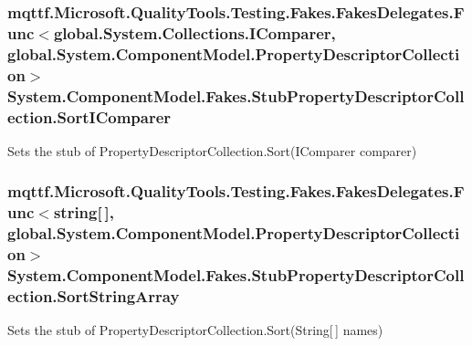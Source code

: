 \hypertarget{class_system_1_1_component_model_1_1_fakes_1_1_stub_property_descriptor_collection_a842e0e66770d608d265cc1eefef45831}{
\subsubsection[{Sort\-I\-Comparer}]{\setlength{\rightskip}{0pt plus 5cm}mqttf.\-Microsoft.\-Quality\-Tools.\-Testing.\-Fakes.\-Fakes\-Delegates.\-Func$<$global.\-System.\-Collections.\-I\-Comparer, global.\-System.\-Component\-Model.\-Property\-Descriptor\-Collection$>$ System.\-Component\-Model.\-Fakes.\-Stub\-Property\-Descriptor\-Collection.\-Sort\-I\-Comparer}}\label{class_system_1_1_component_model_1_1_fakes_1_1_stub_property_descriptor_collection_a842e0e66770d608d265cc1eefef45831}


Sets the stub of Property\-Descriptor\-Collection.\-Sort(\-I\-Comparer comparer)

\hypertarget{class_system_1_1_component_model_1_1_fakes_1_1_stub_property_descriptor_collection_a88d0c3241210e31638fdc458e6eea85c}{
\subsubsection[{Sort\-String\-Array}]{\setlength{\rightskip}{0pt plus 5cm}mqttf.\-Microsoft.\-Quality\-Tools.\-Testing.\-Fakes.\-Fakes\-Delegates.\-Func$<$string\mbox{[}$\,$\mbox{]}, global.\-System.\-Component\-Model.\-Property\-Descriptor\-Collection$>$ System.\-Component\-Model.\-Fakes.\-Stub\-Property\-Descriptor\-Collection.\-Sort\-String\-Array}}\label{class_system_1_1_component_model_1_1_fakes_1_1_stub_property_descriptor_collection_a88d0c3241210e31638fdc458e6eea85c}


Sets the stub of Property\-Descriptor\-Collection.\-Sort(\-String\mbox{[}$\,$\mbox{]} names)

